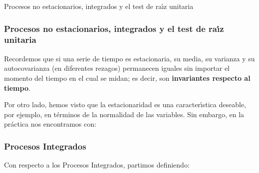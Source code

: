 \documentclass[spanish,xcolor=table]{beamer}
\begin{document}

\begin{section}{Procesos no estacionarios, integrados y el test de ra\'{\i}z unitaria}
\begin{frame}
\frametitle{Procesos no estacionarios, integrados y el test de ra\'{\i}z unitaria}

Recordemos que si una serie de tiempo es estacionaria, su media, su varianza y su autocovarianza (en diferentes rezagos) permanecen iguales sin importar el momento del tiempo en el cual se midan; es decir, son \textbf{invariantes respecto al tiempo}.
\par
Por otro lado, hemos visto que la estacionaridad es una caracter\'{\i}stica deseable, por ejemplo, en t\'erminos de la normalidad de las variables. Sin embargo, en la pr\'actica nos encontramos con:
\par
{}
 
\end{frame}

\begin{frame}
\frametitle{Procesos Integrados}

Con respecto a los Procesos Integrados, partimos definiendo:
 
\end{frame}


\end{section}
\end{document}
